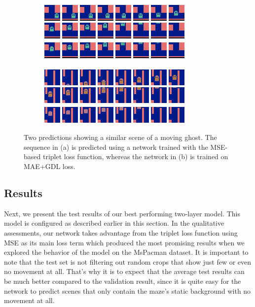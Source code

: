 \begin{figure}[h!tb]
\centering
\begin{subfigure}{0.49\textwidth}
  \centering
  \includegraphics[width=0.92\linewidth]{figures/pred/pac/blurry/pred-sharp.png}
  \caption{}
  \label{fig:pac-pred-sharp_sample}
\end{subfigure}%
\begin{subfigure}{0.49\textwidth}
  \centering
  \includegraphics[width=0.92\linewidth]{figures/pred/pac/blurry/pred-blurry.png}
  \caption{}
  \label{fig:pac-pred-blurry_sample}
\end{subfigure}
\caption[Generated MsPacman Patches using Different Loss Functions]{Two predictions showing a similar scene of a moving ghost. The sequence in (a) is predicted using a network trained with the MSE-based triplet loss function, whereas the network in (b) is trained on MAE+GDL loss.} \label{fig:pac-pred-blurry}
\end{figure}


\subsection{Results}

Next, we present the test results of our best performing two-layer model. This model is configured as described earlier in this section. In the qualitative assessments, our network takes advantage from the triplet loss function using MSE as its main loss term which produced the most promising results when we explored the behavior of the model on the MsPacman dataset. It is important to note that the test set is not filtering out random crops that show just few or even no movement at all. That's why it is to expect that the average test results can be much better compared to the validation result, since it is quite easy for the network to predict scenes that only contain the maze's static background with no movement at all.


